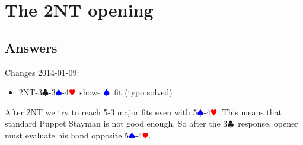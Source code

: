 \documentclass[a4paper]{article}
\newcommand{\BC}{\textcolor{OliveGreen}{$\clubsuit$}}
\newcommand{\BH}{\textcolor{Red}{$\varheartsuit${}}}
\newcommand{\BS}{\textcolor{Blue}{$\spadesuit${}}}
\begin{document}
\section{The 2NT opening}

\subsection{Answers}

Changes 2014-01-09:
\bigbreak
\begin{itemize}
\item 2NT-3\BC -3\BS -4\BH\ shows \BS\ fit (typo solved)

\end{itemize}
\bigbreak
After 2NT we try to reach 5-3 major fits even with 5\BS -4\BH . This means that
standard Puppet Stayman is not good enough. So after the 3\BC\ response, opener
must evaluate his hand opposite 5\BS -4\BH .
\bigbreak
\
\end{document}
